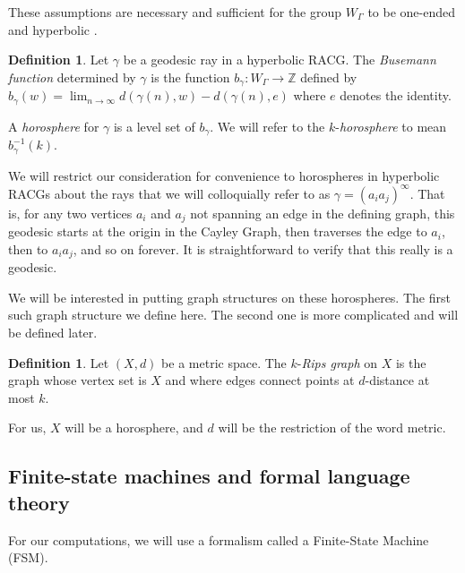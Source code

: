 \documentclass[10pt,a4paper]{amsart}
\newcommand{\Z}{\mathbb{Z}}
\theoremstyle{definition}
\newtheorem{definition}[theorem]{Definition}
\theoremstyle{remark}
\begin{document}
	
	
	These assumptions are necessary and sufficient for the group $W_\Gamma$ to be one-ended and hyperbolic \cite{Davis}.
	
	\begin{definition}
		
		Let $\gamma$ be a geodesic ray in a hyperbolic RACG. The \textit{Busemann function} determined by $\gamma$ is the function $b_\gamma:W_\Gamma\to \Z$ defined by $b_\gamma(w)=\lim_{n\to\infty} d(\gamma(n), w)-d(\gamma(n), e)$ where $e$ denotes the identity.
		
		A \textit{horosphere} for $\gamma$ is a level set of $b_\gamma$. We will refer to the $k$-\textit{horosphere} to mean $b_\gamma^{-1}(k)$.
		
	\end{definition}
	
	We will restrict our consideration for convenience to horospheres in hyperbolic RACGs about the rays that we will colloquially refer to as $\gamma = (a_ia_j)^\infty$. That is, for any two vertices $a_i$ and $a_j$ not spanning an edge in the defining graph, this geodesic starts at the origin in the Cayley Graph, then traverses the edge to $a_i$, then to $a_ia_j$, and so on forever. It is straightforward to verify that this really is a geodesic.
	
	We will be interested in putting graph structures on these horospheres. The first such graph structure we define here. The second one is more complicated and will be defined later.
	
	\begin{definition}
		
		Let $(X,d)$ be a metric space. The $k$-\textit{Rips graph} on $X$ is the graph whose vertex set is $X$ and where edges connect points at $d$-distance at most $k$.
		
	\end{definition}
	
	For us, $X$ will be a horosphere, and $d$ will be the restriction of the word metric.

        \subsection*{Finite-state machines and formal language theory}
	
	For our computations, we will use a formalism called a Finite-State Machine (FSM).
	
\end{document}
